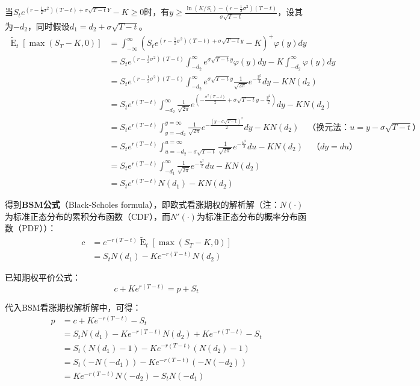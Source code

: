 \documentclass[11pt]{article}
\newcommand{\E}{\operatorname{E}}
\begin{document}
当$S_t e^{(r-\frac{1}{2}\sigma^2)(T-t) + \sigma\sqrt{T-t}Y} - K \geq 0$时，有$y \geq \frac{ \ln (K/S_t) - (r-\frac{1}{2}\sigma^2)(T-t)}{\sigma\sqrt{T-t}}$，设其为$-d_2$，同时假设$d_1 = d_2 + \sigma \sqrt{T-t}$。
\begin{align*}
    \tilde{\E}_t \left[ \max(S_T-K,0) \right] & = \int_{-\infty}^{\infty} \left( S_t e^{(r-\frac{1}{2}\sigma^2)(T-t) + \sigma\sqrt{T-t}y} - K \right)^+ \varphi(y) dy \\
    & = S_t e^{(r-\frac{1}{2}\sigma^2)(T-t)} \int_{-d_2}^{\infty} e^{\sigma\sqrt{T-t} y} \varphi(y)dy - K\int_{-d_2}^{\infty} \varphi(y)dy \\
    & = S_t e^{(r-\frac{1}{2} \sigma^2) (T-t)} \int_{-d_2}^{\infty}{e^{\sigma\sqrt{T-t}y} \frac{1}{\sqrt{2\pi\ }}e^{-\frac{y^2}{2}}dy} - KN\left(d_2\right) \\
    & = S_t e^{r(T-t)} \int_{-d_2}^{\infty} \frac{1}{\sqrt{2\pi}} e^{\left( -\frac{\sigma^2 (T-t)}{2} + \sigma\sqrt{T-t}y - \frac{y^2}{2} \right)} dy - KN(d_2) \\
    & = S_t e^{r(T-t)} \int_{y = -d_2}^{y = \infty} \frac{1}{\sqrt{2\pi}}e^{-\frac{\left(y-\sigma\sqrt{T-t}\right)^2}{2}}dy - KN(d_2) \quad \text{（换元法：$u =y -\sigma\sqrt{T-t}$）} \\
    & =S_t e^{r(T-t)} \int_{u = -d_2-\sigma\sqrt{T-t}}^{u = \infty} \frac{1}{\sqrt{2\pi\ }}e^{-\frac{u^2}{2}}du - KN(d_2) \quad \text{（$dy = du$）} \\
    & = S_t e^{r(T-t)} \int_{-d_1}^{\infty} \frac{1}{\sqrt{2\pi}}e^{-\frac{u^2}{2}} du - KN(d_2) \\
    & = S_t e^{r(T-t)}N(d_1) - KN(d_2)
\end{align*}

得到\textbf{BSM公式}（Black-Scholes formula），即欧式看涨期权的解析解（注：$N(\cdot)$为标准正态分布的累积分布函数（CDF），而$N'(\cdot)$为标准正态分布的概率分布函数（PDF））：
\begin{align*}
    c & = e^{-r(T-t)} \tilde{\E}_t \left[ \max(S_T-K,0) \right] \\
    & = S_t N(d_1) - Ke^{-r(T-t)} N(d_2)
\end{align*}

已知期权平价公式：
\begin{equation*}
    c + K e^{r(T-t)} = p + S_t
\end{equation*}

代入BSM看涨期权解析解中，可得：
\begin{align*}
    p & = c + K e^{-r(T-t)} - S_t \\
    & = S_t N(d_1) - Ke^{-r(T-t)} N(d_2) +  Ke^{-r(T-t)} - S_t \\
    & = S_t (N(d_1) - 1) - K e^{-r(T-t)}(N(d_2)-1) \\
    & = S_t (-N(-d_1)) - K e^{-r(T-t)}(-N(-d_2)) \\
    & = K e^{-r(T-t)}N(-d_2) - S_t N(-d_1) \\
\end{align*}
\end{document}
